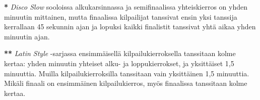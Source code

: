\documentclass[12pt, a4paper, oneside]{article}
\begin{document}
\textbf{*} \textit{Disco Slow} sooloissa alkukarsinnassa ja semifinaalissa yhteiskierros on yhden minuutin mittainen, mutta finaalissa kilpailijat tanssivat ensin yksi tanssija kerrallaan 45 sekunnin ajan ja lopuksi kaikki finalistit tanssivat yhtä aikaa yhden minuutin ajan.

\textbf{**} \textit{Latin Style} -sarjassa ensimmäisellä kilpailukierroksella tanssitaan kolme kertaa: yhden minuutin yhteiset alku- ja loppukierrokset, ja yksittäiset 1,5 minuuttia. Muilla kilpailukierroksilla tanssitaan vain yksittäinen 1,5 minuuttia. Mikäli finaali on ensimmäinen kilpailukierros, myös finaalissa tanssitaan kolme kertaa.
\end{document}
